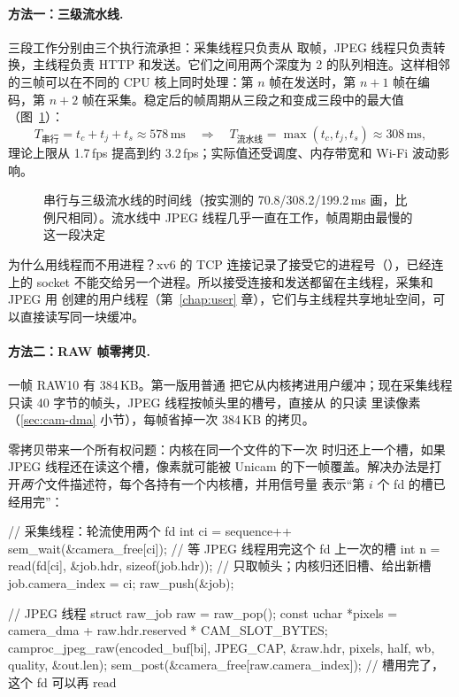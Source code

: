 \paragraph{方法一：三级流水线.} 三段工作分别由三个执行流承担：采集线程只负责从  取帧，JPEG 线程只负责转换，主线程负责 HTTP 和发送。它们之间用两个深度为 2 的队列相连。这样相邻的三帧可以在不同的 CPU 核上同时处理：第 $n$ 帧在发送时，第 $n{+}1$ 帧在编码，第 $n{+}2$ 帧在采集。稳定后的帧周期从三段之和变成三段中的最大值（图~\ref{fig:cam-pipe}）：
\[
  T_{\text{串行}} = t_c + t_j + t_s \approx 578\,\text{ms}
  \quad\Longrightarrow\quad
  T_{\text{流水线}} = \max(t_c, t_j, t_s) \approx 308\,\text{ms},
\]
理论上限从 1.7\,fps 提高到约 3.2\,fps；实际值还受调度、内存带宽和 Wi-Fi 波动影响。

\begin{figure}[htbp]
  \centering
  
  \caption{串行与三级流水线的时间线（按实测的 70.8/308.2/199.2\,ms 画，比例尺相同）。流水线中 JPEG 线程几乎一直在工作，帧周期由最慢的这一段决定}
  \label{fig:cam-pipe}
\end{figure}

为什么用线程而不用进程？xv6 的 TCP 连接记录了接受它的进程号（），已经连上的 socket 不能交给另一个进程。所以接受连接和发送都留在主线程，采集和 JPEG 用  创建的用户线程（第~\ref{chap:user} 章），它们与主线程共享地址空间，可以直接读写同一块缓冲。

\paragraph{方法二：RAW 帧零拷贝.} 一帧 RAW10 有 384\,KB。第一版用普通  把它从内核拷进用户缓冲；现在采集线程只读 40 字节的帧头，JPEG 线程按帧头里的槽号，直接从  的只读  里读像素（\ref{sec:cam-dma} 小节），每帧省掉一次 384\,KB 的拷贝。

零拷贝带来一个所有权问题：内核在同一个文件的下一次  时归还上一个槽，如果 JPEG 线程还在读这个槽，像素就可能被 Unicam 的下一帧覆盖。解决办法是打开\emph{两个}文件描述符，每个各持有一个内核槽，并用信号量  表示“第 $i$ 个 fd 的槽已经用完”：

\begin{ccode}
// 采集线程：轮流使用两个 fd
int ci = sequence++ %
sem_wait(&camera_free[ci]);              // 等 JPEG 线程用完这个 fd 上一次的槽
int n = read(fd[ci], &job.hdr, sizeof(job.hdr));   // 只取帧头；内核归还旧槽、给出新槽
job.camera_index = ci;
raw_push(&job);

// JPEG 线程
struct raw_job raw = raw_pop();
const uchar *pixels = camera_dma + raw.hdr.reserved * CAM_SLOT_BYTES;
camproc_jpeg_raw(encoded_buf[bi], JPEG_CAP, &raw.hdr, pixels, half, wb, quality, &out.len);
sem_post(&camera_free[raw.camera_index]);  // 槽用完了，这个 fd 可以再 read
\end{ccode}

